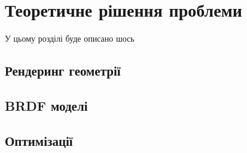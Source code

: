 

 \setcounter{chapter}{1}
 \chapter{Теоретичне рішення проблеми}

 
 У цьому розділі буде описано шось

\section{Рендеринг геометрії}
  \setcounter{equation}{0}
 \setcounter{theorem}{0}
 
\section{BRDF моделі}
\setcounter{equation}{0}
\setcounter{theorem}{0}

\section{Оптимізації}
 \setcounter{equation}{0}
 \setcounter{theorem}{0}